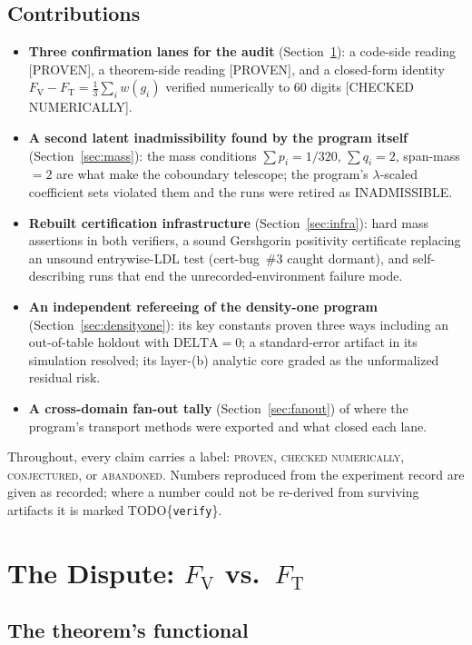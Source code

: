 \documentclass[11pt]{article}
\newcommand{\Fv}{F_{\mathrm{V}}}
\newcommand{\Ft}{F_{\mathrm{T}}}
\begin{document}
\subsection{Contributions}
\begin{itemize}
\item \textbf{Three confirmation lanes for the audit} (Section~\ref{sec:dispute}):
  a code-side reading [PROVEN], a theorem-side reading [PROVEN], and a
  closed-form identity $\Fv - \Ft = \tfrac13\sum_i w(g_i)$ verified numerically
  to 60 digits [CHECKED NUMERICALLY].
\item \textbf{A second latent inadmissibility found by the program itself}
  (Section~\ref{sec:mass}): the mass conditions $\sum p_i = 1/320$,
  $\sum q_i = 2$, span-mass $= 2$ are what make the coboundary telescope; the
  program's $\lambda$-scaled coefficient sets violated them and the runs were
  retired as INADMISSIBLE.
\item \textbf{Rebuilt certification infrastructure} (Section~\ref{sec:infra}):
  hard mass assertions in both verifiers, a sound Gershgorin positivity
  certificate replacing an unsound entrywise-LDL test (cert-bug~\#3 caught
  dormant), and self-describing runs that end the unrecorded-environment
  failure mode.
\item \textbf{An independent refereeing of the density-one program}
  (Section~\ref{sec:densityone}): its key constants proven three ways including
  an out-of-table holdout with $\mathrm{DELTA}=0$; a standard-error artifact in
  its simulation resolved; its layer-(b) analytic core graded as the
  unformalized residual risk.
\item \textbf{A cross-domain fan-out tally} (Section~\ref{sec:fanout}) of where
  the program's transport methods were exported and what closed each lane.
\end{itemize}

Throughout, every claim carries a label: \textsc{proven},
\textsc{checked numerically}, \textsc{conjectured}, or \textsc{abandoned}.
Numbers reproduced from the experiment record are given as recorded; where a
number could not be re-derived from surviving artifacts it is marked
TODO\{\texttt{verify}\}.

\section{The Dispute: $\Fv$ vs.\ $\Ft$}
\label{sec:dispute}

\subsection{The theorem's functional}
\label{sec:theorem}
\end{document}
